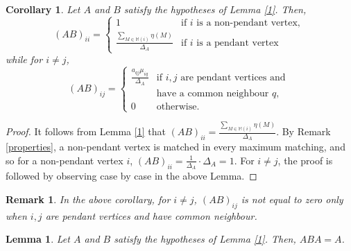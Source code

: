 \documentclass[notitlepage,12pt,reqno]{amsart}
\newtheorem{lem}[thm]{Lemma}
\newtheorem{cor}[thm]{Corollary}
\newtheorem{rem}[thm]{Remark}
\numberwithin{equation}{section}
\begin{document}
\begin{cor}\label{modified first equation}
Let $A$ and $B$ satisfy the hypotheses of Lemma \ref{1}. Then,\\
$$(AB) _{ii}=\left\{\begin{array}{cl} 1 &\mbox{if }i\mbox{ is a non-pendant vertex, }\\ \frac{\sum_{M\in \mathbb{M}(i)}\eta (M)}{\Delta _A} &\mbox{if }i\mbox{ is a pendant vertex}\end{array}\right.$$
while for $i\neq j$,
$$(AB) _{ij}=\left\{\begin{array}{cl} \frac{a_{qj}\mu _{iq}}{\Delta _A} &\mbox{if }i,j\mbox{ are pendant vertices and }\\  & \mbox{have a common neighbour } q,\\ 0 &\mbox{otherwise. }\end{array}\right.$$
\end{cor}
\begin{proof}
It follows from Lemma \ref{1} that $(AB)_{ii}=\frac{\sum_{M\in \mathbb{M}(i)}\eta (M)}{\Delta _A}$. By Remark \ref{properties}, a non-pendant vertex is matched in every maximum matching, and so for a non-pendant vertex $i$, $(AB)_{ii}=\frac{1}{\Delta _A}\cdot \Delta _A=1$. For $i\neq j$, the proof is followed by observing case by case in the above Lemma.
\end{proof}
\begin{rem}\label{zero}
In the above corollary, for $i\neq j$, $(AB)_{ij}$ is not equal to zero only when $i,j$ are pendant vertices and have common neighbour.
\end{rem}
\begin{lem}\label{2}
Let $A$ and $B$ satisfy the hypotheses of Lemma \ref{1}. Then, $ABA = A$.
\end{lem}
\end{document}
